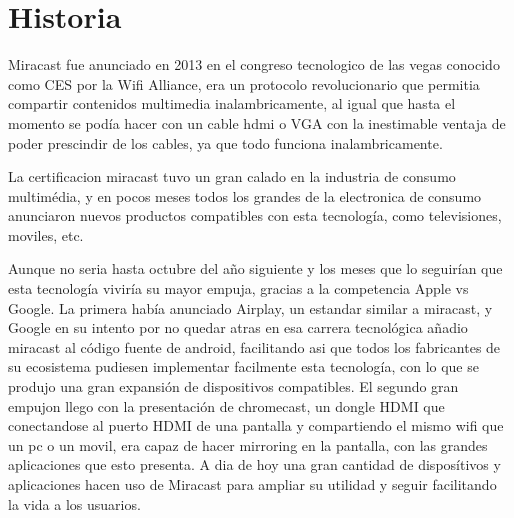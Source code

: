 \section{Historia}
Miracast fue anunciado en 2013 en el congreso tecnologico de las vegas conocido como CES por la Wifi Alliance, era un protocolo revolucionario que permitia compartir contenidos multimedia inalambricamente, al igual que hasta el momento se podía hacer con un cable hdmi o VGA con la inestimable ventaja de poder prescindir de los cables, ya que todo funciona inalambricamente.

La certificacion miracast tuvo un gran calado en la industria de consumo multimédia, y en pocos meses todos los grandes de la electronica de consumo anunciaron nuevos productos compatibles con esta tecnología, como televisiones, moviles, etc.

Aunque no seria hasta octubre del año siguiente y los meses que lo seguirían que esta tecnología viviría su mayor empuja, gracias a la competencia Apple vs Google. La primera había anunciado Airplay, un estandar similar a miracast, y Google en su intento por no quedar atras en esa carrera tecnológica añadio miracast al código fuente de android, facilitando asi que todos los fabricantes de su ecosistema pudiesen implementar facilmente esta tecnología, con lo que se produjo una gran expansión de dispositivos compatibles.
El segundo gran empujon llego con la presentación de chromecast, un dongle HDMI que conectandose al puerto HDMI de una pantalla y compartiendo el mismo wifi que un pc o un movil, era capaz de hacer mirroring en la pantalla, con las grandes aplicaciones que esto presenta.
A dia de hoy una gran cantidad de disposítivos y aplicaciones hacen uso de Miracast para ampliar su utilidad y seguir facilitando la vida a los usuarios.
